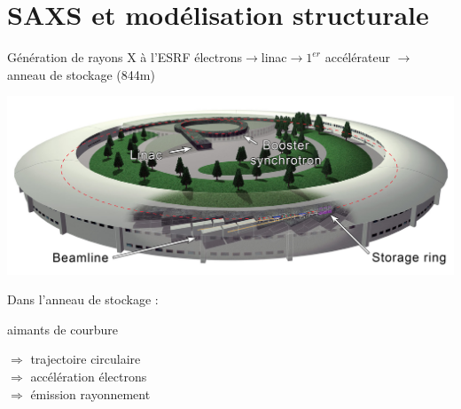 \documentclass{beamer}
\begin{document}
\section{SAXS et mod\'elisation structurale}

\begin{frame}{G\'en\'eration de rayons X \`a l'ESRF}
\vspace{-0.4cm}
\'electrons$\rightarrow$linac$\rightarrow$$1^{er}$ acc\'el\'erateur
$\rightarrow$ anneau de stockage (844m)

\vspace{0.4cm}
\begin{minipage}{0.70\linewidth}
    \begin{flushleft}
    \includegraphics[scale=0.12]{synchrotron.png}
    \end{flushleft}
\end{minipage}

\vspace{0.4cm}
Dans l'anneau de stockage :\\
\begin{minipage}{0.45\linewidth}
    \begin{center}
    \vspace{-0.9cm}
    aimants de courbure\\
    \end{center}
\end{minipage}
\begin{minipage}{0.50\linewidth}
    $\Rightarrow$ trajectoire circulaire\\
    $\Rightarrow$ acc\'el\'eration \'electrons\\
    $\Rightarrow$ \'emission rayonnement
\end{minipage}


\end{frame}
\end{document}
